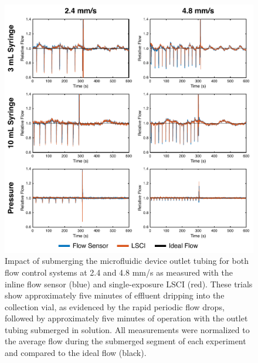 \documentclass{article}
\begin{document}
\begin{figure}
    \includegraphics[width=\textwidth]{FigureS1.pdf}
    \caption {
        Impact of submerging the microfluidic device outlet tubing for both flow control systems at 2.4 and 4.8 mm/s as measured with the inline flow sensor (blue) and single-exposure LSCI (red). These trials show approximately five minutes of effluent dripping into the collection vial, as evidenced by the rapid periodic flow drops, followed by approximately five minutes of operation with the outlet tubing submerged in solution. All measurements were normalized to the average flow during the submerged segment of each experiment and compared to the ideal flow (black).
    }
    \label{fig:supplement_outlet}
\end{figure}
\end{document}
